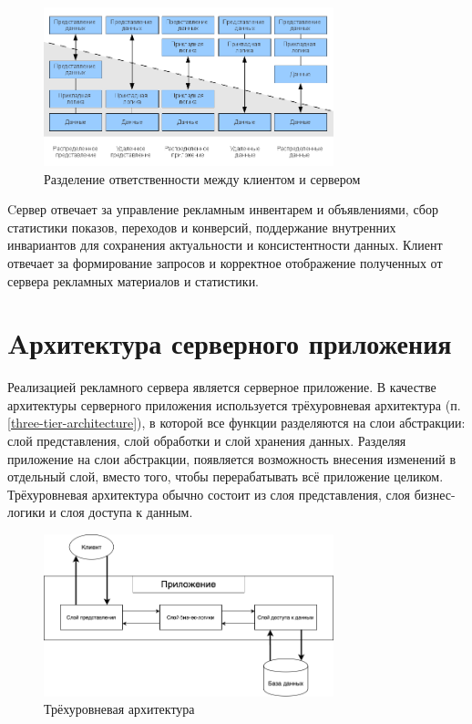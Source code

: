 \documentclass[specification,annotation,times]{itmo-student-thesis}
\begin{document}
\begin{figure}[h]
\caption{Разделение ответственности между клиентом и сервером}
\includegraphics[width=0.75\textwidth]{cs-models}
\centering
\end{figure}

Cервер отвечает за управление рекламным инвентарем и объявлениями, сбор статистики показов, переходов и конверсий, поддержание внутренних инвариантов для сохранения актуальности и консистентности данных. Клиент отвечает за формирование запросов и корректное отображение полученных от сервера рекламных материалов и статистики.




\section{Aрхитектура серверного приложения}

  Реализацией рекламного сервера является серверное приложение. В качестве архитектуры серверного приложения используется трёхуровневая архитектура (п. \ref{three-tier-architecture}), в которой все функции разделяются на слои абстракции: слой представления, слой обработки и слой хранения данных. Разделяя приложение на слои абстракции, появляется возможность внесения изменений в отдельный слой, вместо того, чтобы перерабатывать всё приложение целиком. Трёхуровневая архитектура обычно состоит из слоя представления, слоя бизнес-логики и слоя доступа к данным.

\begin{figure}[h]
\caption{Трёхуровневая архитектура}
\includegraphics[width=0.75\textwidth]{three-tier-architecture}
\centering
\end{figure}
\end{document}
